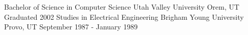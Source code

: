 

\begin{cventries}

  \cventry
    {Bachelor of Science in Computer Science} %
    {Utah Valley University} %
    {Orem, UT} %
    {Graduated 2002} %
    {
    }
  \cventry
  {Studies in Electrical Engineering} %
  {Brigham Young University} %
  {Provo, UT} %
  {September 1987 - January 1989} %
      {
      }
\end{cventries}
